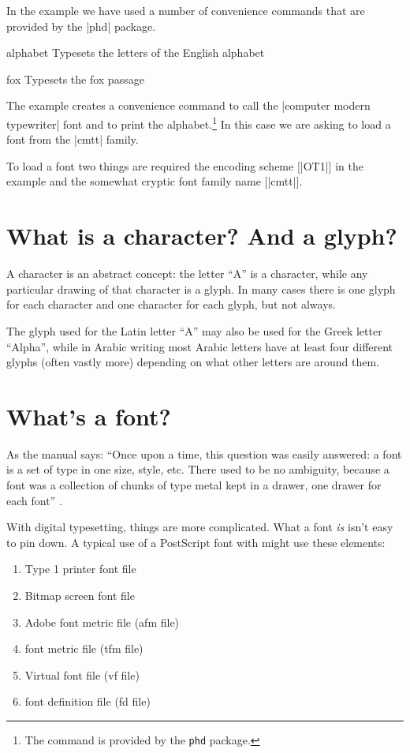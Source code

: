 In the example we have used a number of convenience commands that are provided by the |phd| package.

\begin{docCmd} {alphabet} {}
  Typesets the letters of the English alphabet
\end{docCmd}  


\begin{docCmd}{fox}{}
  Typesets the fox passage
\end{docCmd}

The example  creates a convenience command to call the |computer modern typewriter| font and to print the alphabet.\footnote{The command  is provided by the \texttt{phd} package.} In this case we are asking \latex to load a font from the |cmtt| family. 

To load a font two things are required the encoding scheme [|OT1|] in the example and the somewhat cryptic font family name [|cmtt|].

\section{What is a character? And a glyph?}
A character is an abstract
concept: the letter “A” is a character, while any
particular drawing of that character is a glyph. In many
cases there is one glyph for each character and one character
for each glyph, but not always.

The glyph used for the Latin letter “A” may also be
used for the Greek letter “Alpha”, while in Arabic writing
most Arabic letters have at least four different glyphs
(often vastly more) depending on what other letters are
around them.

\section{What's a font?}

As the  manual says: ``Once upon a time, this question was easily answered: a font is a set of type
in one size, style, etc. There used to be no ambiguity, because a font was a
collection of chunks of type metal kept in a drawer, one drawer for each font'' \citet{fontinst}.


With digital typesetting, things are more complicated. What a font
\textit{is} isn't easy to pin down. A typical use of a PostScript font with \latex might
use these elements:

\begin{enumerate}
\item Type 1 printer font file
\item Bitmap screen font file
\item Adobe font metric file (afm file)
\item \tex font metric file (tfm file)
\item Virtual font file (vf file)
\item font definition file (fd file)
\end{enumerate}

